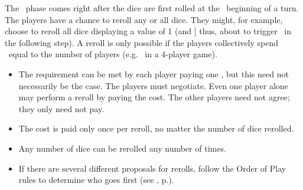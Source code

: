 The \diplomacy\ phase comes right after the dice are first rolled at the \
beginning of a turn.  The players have a chance to reroll any or all dice.  They
might, for example, choose to reroll all dice displaying a value of 1 (and ]
thus, about to trigger \disasters\ in the following step).  A reroll is only 
possible if the players collectively spend \currency\ equal to the number of 
players (e.g. \spendcurrency\spendcurrency\spendcurrency\spendcurrency\ in a 
4-player game).
\begin{itemize}
  \item The requirement can be met by each player paying one \currency, but this
        need not necessarily be the case.  The players must negotiate.  Even one
        player alone may perform a reroll by paying the cost.  The other players
        need not agree; they only need not pay.
  \item The cost is paid only once per reroll, no matter the number of dice 
        rerolled.
  \item Any number of dice can be rerolled any number of times.
  \item If there are several different proposals for rerolls, follow the Order 
        of Play rules to determine who goes first (see \nameref{sec:order}, 
        p.\pageref{sec:order}).
\end{itemize}
